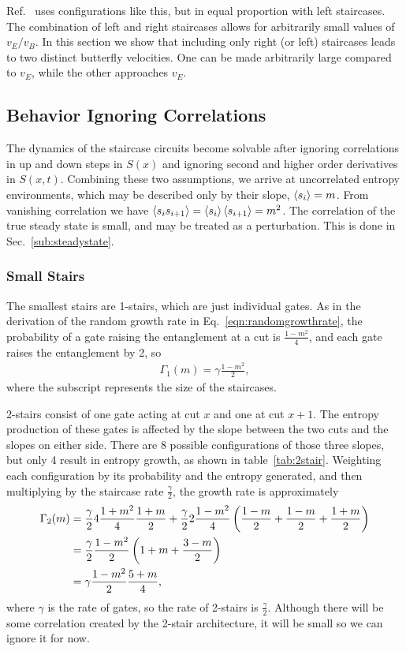 Ref.~\cite{Nahum2018} uses configurations like this, but in equal proportion with left staircases. The combination of left and right staircases allows for arbitrarily small values of $v_E/v_B$. In this section we show that including only right (or left) staircases leads to two distinct butterfly velocities. One can be made arbitrarily large compared to $v_E$, while the other approaches $v_E$.

\subsection{Behavior Ignoring Correlations} \label{sub:anal}

The dynamics of the staircase circuits become solvable after ignoring correlations in up and down steps in $S(x)$ and ignoring second and higher order derivatives in $S(x,t)$. Combining these two assumptions, we arrive at uncorrelated entropy environments, which may be described only by their slope, $\left\langle s_i \right\rangle = m$. From vanishing correlation we have $\left\langle s_is_{i+1} \right\rangle = \left\langle s_i \right\rangle\left\langle s_{i+1} \right\rangle = m^2$. The correlation of the true steady state is small, and may be treated as a perturbation. This is done in Sec.~\ref{sub:steadystate}.

\subsubsection{Small Stairs} \label{subsub:smallstairs} 

The smallest stairs are 1-stairs, which are just individual gates. As in the derivation of the random growth rate in Eq.~\ref{eqn:randomgrowthrate}, the probability of a gate raising the entanglement at a cut is $\frac{1-m^2}{4}$, and each gate raises the entanglement by 2, so 
\begin{align}
\Gamma_1(m) = \gamma\frac{1-m^2}{2},
\end{align}
where the subscript represents the size of the staircases.

2-stairs consist of one gate acting at cut $x$ and one at cut $x+1$. The entropy production of these gates is affected by the slope between the two cuts and the slopes on either side. There are 8 possible configurations of those three slopes, but only 4 result in entropy growth, as shown in table~\ref{tab:2stair}. Weighting each configuration by its probability and the entropy generated, and then multiplying by the staircase rate $\frac{\gamma}{2}$, the growth rate is approximately
\begin{align}
\Gamma_2(m) &= \frac{\gamma}{2} 4\frac{1+m^2}{4}\frac{1+m}{2} + \frac{\gamma}{2}
	2\frac{1-m^2}{4}
	\left(\frac{1-m}{2} + \frac{1-m}{2} + \frac{1+m}{2}\right) \nonumber\\
&= \frac{\gamma}{2}\frac{1-m^2}{2}\left(1+m + \frac{3-m}{2}\right)\nonumber\\
&= \gamma\frac{1-m^2}{2}\frac{5+m}{4}, \label{eqn:2rate}
\end{align}
where $\gamma$ is the rate of gates, so the rate of 2-stairs is $\frac{\gamma}{2}$. Although there will be some correlation created by the 2-stair architecture, it will be small so we can ignore it for now. 

